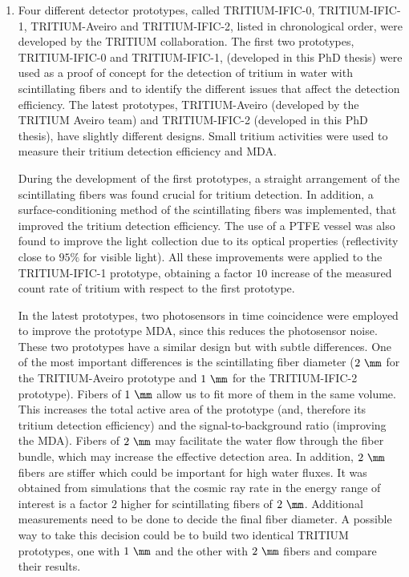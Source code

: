 \begin{enumerate}

\item{} Four different detector prototypes, called TRITIUM-IFIC-0, TRITIUM-IFIC-1, TRITIUM-Aveiro and TRITIUM-IFIC-2, listed in chronological order, were developed by the TRITIUM collaboration. The first two prototypes, TRITIUM-IFIC-0 and TRITIUM-IFIC-1, (developed in this PhD thesis) were used as a proof of concept for the detection of tritium in water with scintillating fibers and to identify the different issues that affect the detection efficiency. The latest prototypes, TRITIUM-Aveiro (developed by the TRITIUM Aveiro team) and TRITIUM-IFIC-2 (developed in this PhD thesis), have slightly different designs. Small tritium activities were used to measure their tritium detection efficiency and MDA. %

During the development of the first prototypes, a straight arrangement of the scintillating fibers was found crucial for tritium detection. In addition, a surface-conditioning method of the scintillating fibers was implemented, that improved the tritium detection efficiency. The use of a PTFE vessel was also found to improve the light collection due to its optical properties (reflectivity close to $95\%$ for visible light). All these improvements were applied to the TRITIUM-IFIC-1 prototype, obtaining a factor $10$ increase of the measured count rate of tritium with respect to the first prototype. %

In the latest prototypes, two photosensors in time coincidence were employed to improve the prototype MDA, since this reduces the photosensor noise. These two prototypes have a similar design but with subtle differences. One of the most important differences is the scintillating fiber diameter ($2~\mm$ for the TRITIUM-Aveiro prototype and $1~\mm$ for the TRITIUM-IFIC-2 prototype). Fibers of $1~\mm$ allow us to fit more of them in the same volume. This increases the total active area of the prototype (and, therefore its tritium detection efficiency) and the signal-to-background ratio (improving the MDA). Fibers of $2~\mm$ may facilitate the water flow through the fiber bundle, which may increase the effective detection area. In addition, $2~\mm$ fibers are stiffer which could be important for high water fluxes. It was obtained from simulations that the cosmic ray rate in the energy range of interest is a factor $2$ higher for scintillating fibers of $2~\mm$. Additional measurements need to be done to decide the final fiber diameter. A possible way to take this decision could be to build two identical TRITIUM prototypes, one with $1~\mm$ and the other with $2~\mm$ fibers and compare their results. 


\end{enumerate}
